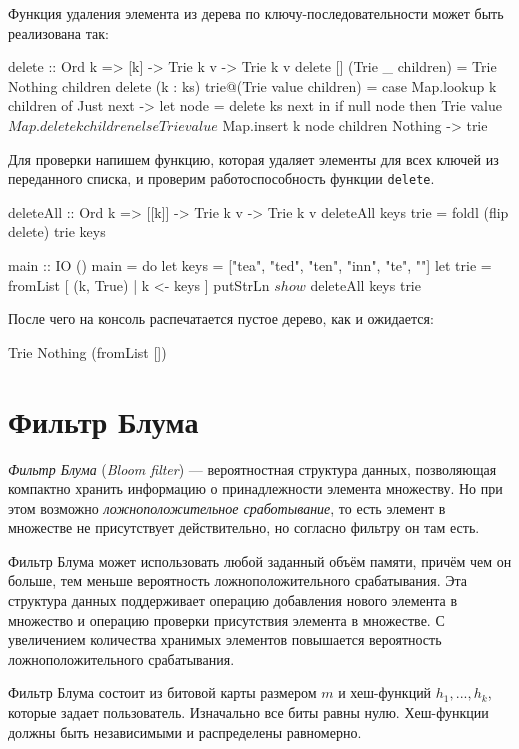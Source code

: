 Функция удаления элемента из дерева по ключу-последовательности может быть реализована так:
\begin{hslst}{}{}
delete :: Ord k => [k] -> Trie k v -> Trie k v
delete [] (Trie _ children) = Trie Nothing children
delete (k : ks) trie@(Trie value children) =
  case Map.lookup k children of
    Just next ->
      let node = delete ks next in
      if null node
      then Trie value $ Map.delete k children
      else Trie value $ Map.insert k node children
    Nothing   -> trie
\end{hslst}

Для проверки напишем функцию, которая удаляет элементы для всех ключей из переданного списка, и проверим работоспособность функции \lstinline{delete}.
\begin{hslst}{}{}
deleteAll :: Ord k => [[k]] -> Trie k v -> Trie k v
deleteAll keys trie = foldl (flip delete) trie keys

main :: IO ()
main = do
  let keys = ["tea", "ted", "ten", "inn", "te", ""]
  let trie = fromList [ (k, True) | k <- keys ]
  putStrLn $ show $ deleteAll keys trie
\end{hslst}

После чего на консоль распечатается пустое дерево, как и ожидается:
\begin{plainlst}{}{}
Trie Nothing (fromList [])
\end{plainlst}

\section{Фильтр Блума}
\label{sec:bloom-filter}
\emph{Фильтр Блума} (\emph{Bloom filter}) — вероятностная структура данных, позволяющая компактно хранить информацию о принадлежности элемента множеству. Но при этом возможно \emph{ложноположительное сработывание}, то есть элемент в множестве не присутствует действительно, но согласно фильтру он там есть.

Фильтр Блума может использовать любой заданный объём памяти, причём чем он больше, тем меньше вероятность ложноположительного срабатывания. Эта структура данных поддерживает операцию добавления нового элемента в множество и операцию проверки присутствия элемента в множестве. С увеличением количества хранимых элементов повышается вероятность ложноположительного срабатывания.

Фильтр Блума состоит из битовой карты размером $m$ и хеш-функций $h_1,...,h_k$, которые задает пользователь. Изначально все биты равны нулю. Хеш-функции должны быть независимыми и распределены равномерно.


